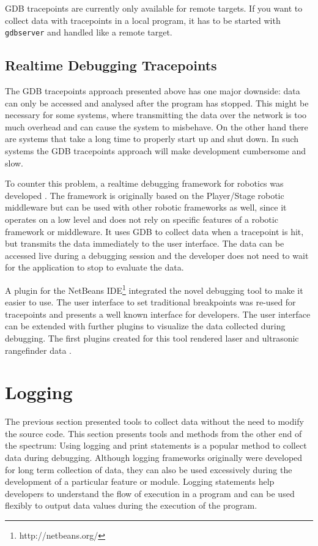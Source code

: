 GDB tracepoints are currently only available for remote targets. If you want to collect data with tracepoints in a local program, it has to be started with \verb+gdbserver+ and handled like a remote target.

\subsection{Realtime Debugging Tracepoints}
\label{realtime_debugging}
The GDB tracepoints approach presented above has one major downside: data can only be accessed and analysed after the program has stopped. This might be necessary for some systems, where transmitting the data over the network is too much overhead and can cause the system to misbehave. On the other hand there are systems that take a long time to properly start up and shut down. In such systems the GDB tracepoints approach will make development cumbersome and slow.

To counter this problem, a realtime debugging framework for robotics was developed \cite{Gumbley2009}. The framework is originally based on the Player/Stage robotic middleware but can be used with other robotic frameworks as well, since it operates on a low level and does not rely on specific features of a robotic framework or middleware. It uses GDB to collect data when a tracepoint is hit, but transmits the data immediately to the user interface. The data can be accessed live during a debugging session and the developer does not need to wait for the application to stop to evaluate the data.

A plugin for the NetBeans IDE\footnote{http://netbeans.org/} integrated the novel debugging tool to make it easier to use. The user interface to set traditional breakpoints was re-used for tracepoints and presents a well known interface for developers. The user interface can be extended with further plugins to visualize the data collected during debugging. The first plugins created for this tool rendered laser and ultrasonic rangefinder data \cite{Gumbley2009}.




\section{Logging}
The previous section presented tools to collect data without the need to modify the source code. This section presents tools and methods from the other end of the spectrum: Using logging and print statements is a popular method to collect data during debugging. Although logging frameworks originally were developed for long term collection of data, they can also be used excessively during the development of a particular feature or module. Logging statements help developers to understand the flow of execution in a program and can be used flexibly to output data values during the execution of the program.


